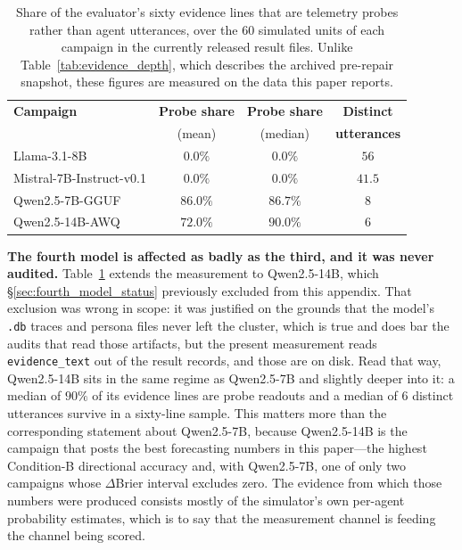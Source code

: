 \documentclass[11pt,journal,onecolumn]{IEEEtran}
\begin{document}
\begin{table}[!htbp]
\centering
\caption{Share of the evaluator's sixty evidence lines that are telemetry probes rather than agent utterances, over the $60$ simulated units of each campaign in the currently released result files. Unlike Table~\ref{tab:evidence_depth}, which describes the archived pre-repair snapshot, these figures are measured on the data this paper reports.}
\label{tab:probe_share}
\small
\begin{tabular}{lccc}
\toprule
\textbf{Campaign} & \textbf{Probe share} & \textbf{Probe share} & \textbf{Distinct} \\
 & (mean) & (median) & \textbf{utterances} \\
\midrule
Llama-3.1-8B             & $0.0\%$          & $0.0\%$          & $56$ \\
Mistral-7B-Instruct-v0.1 & $0.0\%$          & $0.0\%$          & $41.5$ \\
Qwen2.5-7B-GGUF          & $\mathbf{86.0\%}$ & $\mathbf{86.7\%}$ & $8$ \\
Qwen2.5-14B-AWQ          & $\mathbf{72.0\%}$ & $\mathbf{90.0\%}$ & $6$ \\
\bottomrule
\end{tabular}
\end{table}

\textbf{The fourth model is affected as badly as the third, and it was never audited.} Table~\ref{tab:probe_share} extends the measurement to Qwen2.5-14B, which \S\ref{sec:fourth_model_status} previously excluded from this appendix. That exclusion was wrong in scope: it was justified on the grounds that the model's \texttt{.db} traces and persona files never left the cluster, which is true and does bar the audits that read those artifacts, but the present measurement reads \texttt{evidence\_text} out of the result records, and those are on disk. Read that way, Qwen2.5-14B sits in the same regime as Qwen2.5-7B and slightly deeper into it: a median of $90\%$ of its evidence lines are probe readouts and a median of $6$ distinct utterances survive in a sixty-line sample. This matters more than the corresponding statement about Qwen2.5-7B, because Qwen2.5-14B is the campaign that posts the best forecasting numbers in this paper---the highest Condition-B directional accuracy and, with Qwen2.5-7B, one of only two campaigns whose $\Delta$Brier interval excludes zero. The evidence from which those numbers were produced consists mostly of the simulator's own per-agent probability estimates, which is to say that the measurement channel is feeding the channel being scored.
\end{document}
